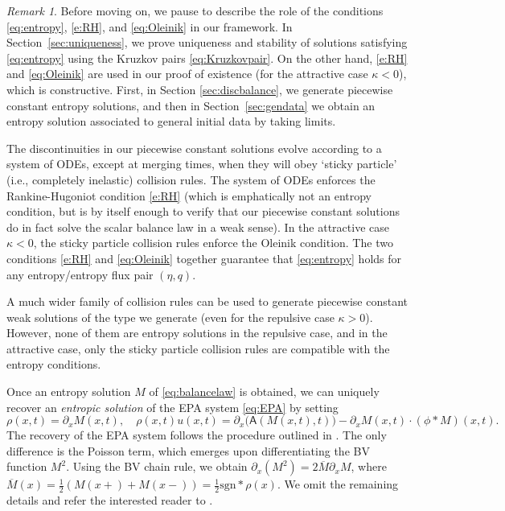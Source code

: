\documentclass[11pt,reqno]{amsart}
\theoremstyle{definition}
\theoremstyle{remark}
\newtheorem{remark}{Remark}
\def\pa{\partial}
\def\A{\mathsf{A}}
\begin{document}
	\begin{remark}
		\label{rem:entconds}
		Before moving on, we pause to describe the role of the conditions \eqref{eq:entropy}, \eqref{e:RH}, and \eqref{eq:Oleinik} in our framework.  
		In Section~\ref{sec:uniqueness}, we prove uniqueness and stability of solutions satisfying \eqref{eq:entropy} using the Kruzkov pairs \eqref{eq:Kruzkovpair}.  On the other hand, \eqref{e:RH} and \eqref{eq:Oleinik} are used in our proof of existence (for the attractive case $\kappa<0$), which is constructive.  First, in Section \ref{sec:discbalance}, we generate piecewise constant entropy solutions, and then in Section~\ref{sec:gendata} we obtain an entropy solution associated to general initial data by taking limits.  
		
		The discontinuities in our piecewise constant solutions evolve according to a system of ODEs, except at merging times, when they will obey `sticky particle' (i.e., completely inelastic) collision rules.  The system of ODEs enforces the Rankine-Hugoniot condition \eqref{e:RH} (which is emphatically not an entropy condition, but is by itself enough to verify that our piecewise constant solutions do in fact solve the scalar balance law in a weak sense).  In the attractive case $\kappa<0$, the sticky particle collision rules  enforce the Oleinik condition.
		The two conditions \eqref{e:RH} and \eqref{eq:Oleinik} together guarantee that \eqref{eq:entropy} holds for any entropy/entropy flux pair $(\eta, q)$.  
		
		A much wider family of collision rules can be used to generate piecewise constant weak solutions of the type we generate (even for the repulsive case $\kappa>0$). However, none of them are entropy solutions in the repulsive case, and in the attractive case, only the sticky particle collision rules are compatible with the entropy conditions.
	\end{remark}
	
	
	Once an entropy solution $M$ of \eqref{eq:balancelaw}  is obtained, we can uniquely recover an \emph{entropic solution} of the EPA system \eqref{eq:EPA} by setting
	\[
	\rho(x,t) = \pa_x M(x,t),\quad \rho(x,t) u(x,t) = \pa_x\big(\A(M(x,t),t)\big) - \pa_x M(x,t)\cdot(\phi\ast M)(x,t). 
	\]
	The recovery of the EPA system follows the procedure outlined in  \cite{leslie2023sticky}.  The only difference is the Poisson term, which emerges upon differentiating the BV function $M^2$.  Using the BV chain rule, we obtain $\partial_x(M^2) = 2\overline{M} \partial_x M$, where $\overline{M}(x) = \frac12 (M(x+) + M(x-)) = \frac12 \mathrm{sgn}*\rho(x)$.  We omit the remaining details and refer the interested reader to \cite{leslie2023sticky}.
	
\end{document}
